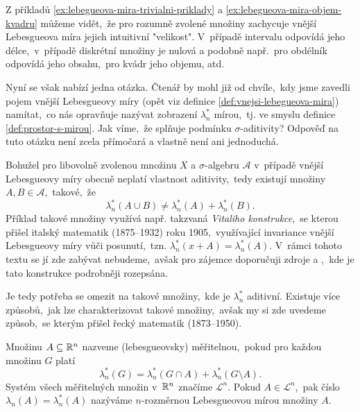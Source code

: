 Z příkladů \ref{ex:lebegueova-mira-trivialni-priklady} a \ref{ex:lebegueova-mira-objem-kvadru} můžeme vidět,~že pro rozumně zvolené množiny zachycuje vnější Lebesgueova míra jejich intuitivní "velikost". V~případě intervalu odpovídá jeho délce,~v~případě diskrétní množiny je nulová a podobně např.~pro obdélník odpovídá jeho obsahu,~pro kvádr jeho objemu, atd.

Nyní se však nabízí jedna otázka. Čtenář by mohl již od chvíle,~kdy jsme zavedli pojem vnější Lebesgueovy míry (opět viz definice \ref{def:vnejsi-lebegueova-mira}) namítat,~co nás opravňuje nazývat zobrazení $\lambda_n^*$ mírou,~tj. ve smyslu definice \ref{def:prostor-s-mirou}. Jak víme,~že splňuje podmínku $\sigma$-aditivity? Odpověď na tuto otázku není zcela přímočará a vlastně není ani jednoduchá.

Bohužel pro libovolně zvolenou množinu $X$ a $\sigma$-algebru $\mathcal{A}$ v~případě vnější Lebesgueovy míry obecně neplatí vlastnost aditivity,~tedy existují množiny $A,B\in\mathcal{A}$,~takové,~že
\[\lambda_n^*(A\cup B)\neq\lambda_n^*(A)+\lambda_n^*(B).\]
Příklad takové množiny využívá např. takzvaná \emph{Vitaliho konstrukce},~se kterou přišel italský matematik  (1875--1932) roku 1905,~využívající invariance vnější Lebesgueovy míry vůči posunutí,~tzn. $\lambda_n^*(x+A)=\lambda_n^*(A)$. \cite{OConnor2025} V~rámci tohoto textu se jí zde zabývat nebudeme,~avšak pro zájemce doporučuji zdroje \citep[str. 3]{Lukes2013} a \cite{Verner2025},~kde je tato konstrukce podrobněji rozepsána.

Je tedy potřeba se omezit na takové množiny,~kde je $\lambda_n^*$ aditivní. Existuje více způsobů,~jak lze charakterizovat takové množiny,~avšak my si zde uvedeme způsob,~se kterým přišel řecký matematik  (1873--1950).
\begin{definition}\label{def:lebesgueovska-meritelnost}
    Množinu $A\subseteq\mathbb{R}^n$ nazveme (lebesgueovsky) měřitelnou,~pokud pro každou množinu $G$ platí
    \[\lambda_n^*(G)=\lambda_n^*(G\cap A)+\lambda_n^*(G\setminus A).\]
    Systém všech měřitelných množin v~$\mathbb{R}^n$ značíme $\mathcal{L}^n$.  Pokud $A\in\mathcal{L}^n$,~pak číslo $\lambda_n(A)=\lambda_n^*(A)$ nazýváme $n$-rozměrnou Lebesgueovou mírou množiny $A$.
\end{definition}